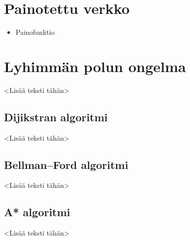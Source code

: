 \section{Painotettu verkko}

\begin{itemize}
  \item Painofunktio
\end{itemize}

\section{Lyhimmän polun ongelma}

<Lisää teksti tähän>

  \subsection{Dijikstran algoritmi}

  <Lisää teksti tähän>

  \subsection{Bellman–Ford algoritmi}

  <Lisää teksti tähän>

  \subsection{A* algoritmi}

  <Lisää teksti tähän>
